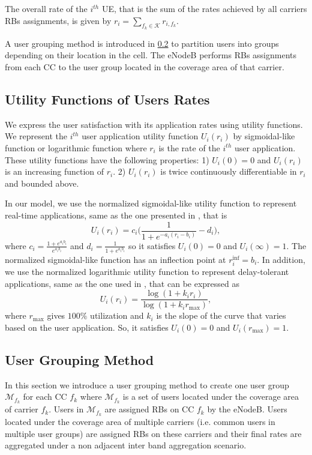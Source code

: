 \documentclass[conference]{IEEEtran}
\begin{document}
The overall rate of the $i^{th}$ UE, that is the sum of the rates achieved by all carriers RBs assignments, is given by $r_i = \sum_{f_k\in \mathcal{K}}r_{i,f_k}$.


A user grouping method is introduced in \ref{sec:UsersGrouping} to partition users into groups depending on their location in the cell. The eNodeB performs RBs assignments from each CC to the user group located in the coverage area of that carrier.
\vspace{-0.5em}
\subsection{Utility Functions of Users Rates}\label{sec:utility functions}
We express the user satisfaction with its application rates using utility functions. We represent the $i^{th}$ user application utility function $U_i (r_i)$  by  sigmoidal-like function or logarithmic function where $r_i$ is the rate of the $i^{th}$ user application. These utility functions have the following properties: 1) $U_i(0) = 0$ and $U_i(r_i)$ is an increasing function of $r_i$. 2) $U_i(r_i)$ is twice continuously differentiable in $r_i$ and bounded above.

In our model, we use the normalized sigmoidal-like utility function to represent real-time applications, same as the one presented in \cite{Ahmed_Utility1}, that is
\begin{equation}\label{eqn:sigmoid}
U_i(r_i) = c_i\Big(\frac{1}{1+e^{-a_i(r_i-b_i)}}-d_i\Big),
\end{equation}
where $c_i = \frac{1+e^{a_ib_i}}{e^{a_ib_i}}$ and $d_i = \frac{1}{1+e^{a_ib_i}}$ so it satisfies $U_i(0)=0$ and $U_i(\infty)=1$. The normalized sigmoidal-like function has an inflection point at $r_i^{\text{inf}}=b_i$. In addition, we use the normalized logarithmic utility function to represent delay-tolerant applications, same as the one used in \cite{Ahmed_Utility1}, that can be expressed as
\begin{equation}\label{eqn:log}
U_i(r_i) = \frac{\log(1+k_ir_i)}{\log(1+k_ir_{\text{max}})},
\end{equation}
where $r_{\text{max}}$ gives $100\%$ utilization and $k_i$ is the slope of the curve that varies based on the user application. So, it satisfies $U_i(0)=0$ and $U_i(r_{\text{max}})=1$.
\vspace{-0.5em}
\subsection{User Grouping Method}\label{sec:UsersGrouping}
In this section we introduce a user grouping method to create one user group $\mathcal{M}_{f_k}$ for each CC $f_k$ where $\mathcal{M}_{f_k}$ is a set of users located under the coverage area of carrier $f_k$. Users in $\mathcal{M}_{f_k}$ are assigned RBs on CC $f_k$ by the eNodeB. Users located under the coverage area of multiple carriers (i.e. common users in multiple user groups) are assigned RBs on these carriers and their final rates are aggregated under a non adjacent inter band aggregation scenario.
\end{document}
